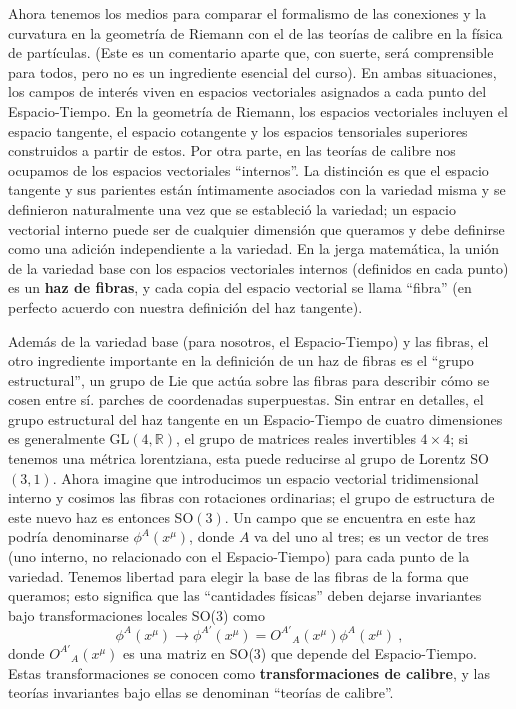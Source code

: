 \documentclass[11pt,b5paper,openany,twoside]{book}
\newcommand{\R}{\mathbb{R}}
\begin{document}
Ahora tenemos los medios para comparar el formalismo de las conexiones y la curvatura en la geometría de Riemann con el de las teorías de calibre en la física de partículas.
(Este es un comentario aparte que, con suerte, será comprensible para todos, pero no es un ingrediente esencial del curso).
En ambas situaciones, los campos de interés viven en espacios vectoriales asignados a cada punto del Espacio-Tiempo.
En la geometría de Riemann, los espacios vectoriales incluyen el espacio tangente, el espacio cotangente y los espacios tensoriales superiores construidos a partir de estos.
Por otra parte, en las teorías de calibre nos ocupamos de los espacios vectoriales ``internos''.
La distinción es que el espacio tangente y sus parientes están íntimamente asociados con la variedad misma y se definieron naturalmente una vez que se estableció la variedad; un espacio vectorial interno puede ser de cualquier dimensión que queramos y debe definirse como una adición independiente a la variedad.
En la jerga matemática, la unión de la variedad base con los espacios vectoriales internos (definidos en cada punto) es un {\bf haz de fibras}, y cada copia del espacio vectorial se llama ``fibra'' (en perfecto acuerdo con nuestra definición del haz tangente).

Además de la variedad base (para nosotros, el Espacio-Tiempo) y las fibras, el otro ingrediente importante en la definición de un haz de fibras es el ``grupo estructural'', un grupo de Lie que actúa sobre las fibras para describir cómo se cosen entre sí. parches de coordenadas superpuestas.
Sin entrar en detalles, el grupo estructural del haz tangente en un Espacio-Tiempo de cuatro dimensiones es generalmente GL$(4,\R)$, el grupo de matrices reales invertibles $4\times 4$; si tenemos una métrica lorentziana, esta puede reducirse al grupo de Lorentz SO$(3,1)$.
Ahora imagine que introducimos un espacio vectorial tridimensional interno y cosimos las fibras con rotaciones ordinarias; el grupo de estructura de este nuevo haz es entonces SO$(3)$.
Un campo que se encuentra en este haz podría denominarse $\phi^A(x^\mu)$, donde $A$ va del uno al tres; es un vector de tres (uno interno, no relacionado con el Espacio-Tiempo) para cada punto de la variedad.
Tenemos libertad para elegir la base de las fibras de la forma que queramos; esto significa que las ``cantidades físicas'' deben dejarse invariantes bajo transformaciones locales SO(3) como
\begin{equation}
\phi^A(x^\mu)\rightarrow \phi^{A'}(x^\mu)=
O^{A'}{}_A(x^\mu)\phi^A(x^\mu)\ ,\label{3.145}
\end{equation}
donde $O^{A'}{}_A(x^\mu)$ es una matriz en SO(3) que depende del Espacio-Tiempo.
Estas transformaciones se conocen como {\bf transformaciones de calibre}, y las teorías invariantes bajo ellas se denominan ``teorías de calibre''.
\end{document}
